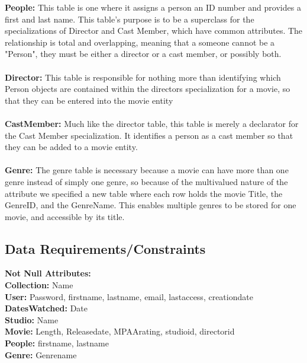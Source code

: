 \documentclass[12pt]{article}
\begin{document}
    \textbf{People:} This table is one where it assigns a person an ID number and provides a first and last name. This table's purpose is to be a superclass for the specializations of Director and Cast Member, which have common attributes. The relationship is total and overlapping, meaning that a someone cannot be a "Person", they must be either a director or a cast member, or possibly both.\\ \\
    \textbf{Director:} This table is responsible for nothing more than identifying which Person objects are contained within the directors specialization for a movie, so that they can be entered into the movie entity\\ \\
    \textbf{Cast\textunderscore Member:} Much like the director table, this table is merely a declarator for the Cast Member specialization. It identifies a person as a cast member so that they can be added to a movie entity.\\ \\
    \textbf{Genre:} The genre table is necessary because a movie can have more than one genre instead of simply one genre, so because of the multivalued nature of the attribute we specified a new table where each row holds the movie Title, the GenreID, and the GenreName. This enables multiple genres to be stored for one movie, and accessible by its title.\\

    \subsection{Data Requirements/Constraints}
    \textbf{Not Null Attributes:}\\
    \textbf{Collection:} Name\\
    \textbf{User:} Password, first\textunderscore name, last\textunderscore name, email, last\textunderscore access, creation\textunderscore date\\
    \textbf{Dates\textunderscore Watched:} Date\\
    \textbf{Studio:} Name\\
    \textbf{Movie:} Length, Release\textunderscore date, MPAA\textunderscore rating, studio\textunderscore id, director\textunderscore id\\
    \textbf{People:} first\textunderscore name, last\textunderscore name\\
    \textbf{Genre:} Genre\textunderscore name
\end{document}
